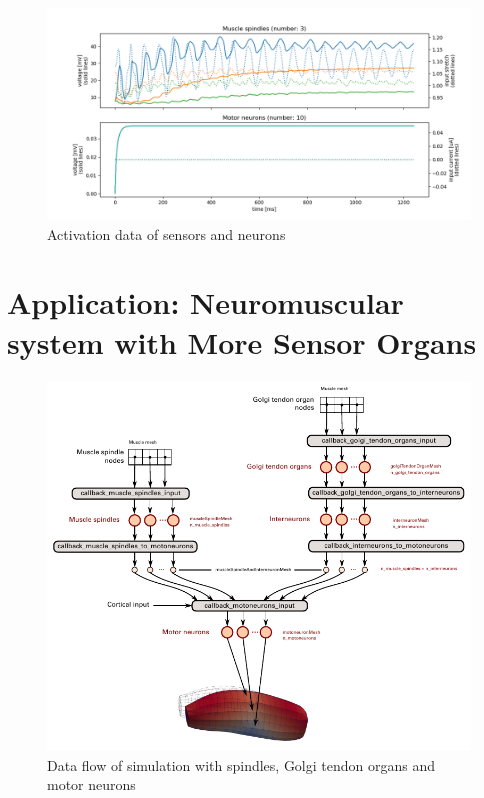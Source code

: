 \begin{figure}[H]
  \centering%
  \includegraphics[width=\textwidth]{images/results/application/neuromuscular_spindle_out.png}%
  \caption{Activation data of sensors and neurons}%
  \label{fig:neuromuscular_schematic}%
\end{figure}

\section{Application: Neuromuscular system with More Sensor Organs}\label{sec:application_neuromuscular_system_more}

\begin{figure}[H]
  \centering%
  \includegraphics[width=\textwidth]{images/results/application/neuromuscular_schematic.pdf}%
  \caption{Data flow of simulation with spindles, Golgi tendon organs and motor neurons}%
  \label{fig:neuromuscular_schematic}%
\end{figure}

